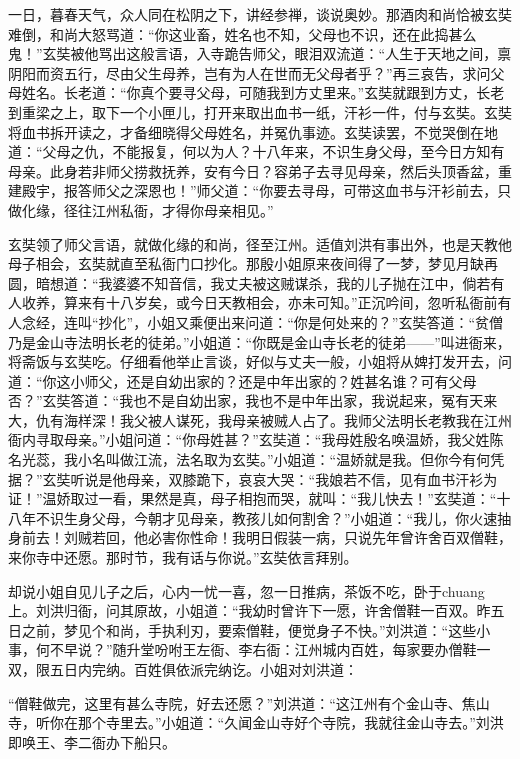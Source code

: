 \documentclass[12pt,UTF8]{ctexbook}
\begin{document}
{	一日，暮春天气，众人同在松阴之下，讲经参禅，谈说奥妙。那酒肉和尚恰被玄奘难倒，和尚大怒骂道：“你这业畜，姓名也不知，父母也不识，还在此捣甚么鬼！”玄奘被他骂出这般言语，入寺跪告师父，眼泪双流道：“人生于天地之间，禀阴阳而资五行，尽由父生母养，岂有为人在世而无父母者乎？”再三哀告，求问父母姓名。长老道：“你真个要寻父母，可随我到方丈里来。”玄奘就跟到方丈，长老到重梁之上，取下一个小匣儿，打开来取出血书一纸，汗衫一件，付与玄奘。玄奘将血书拆开读之，才备细晓得父母姓名，并冤仇事迹。玄奘读罢，不觉哭倒在地道：“父母之仇，不能报复，何以为人？十八年来，不识生身父母，至今日方知有母亲。此身若非师父捞救抚养，安有今日？容弟子去寻见母亲，然后头顶香盆，重建殿宇，报答师父之深恩也！”师父道：“你要去寻母，可带这血书与汗衫前去，只做化缘，径往江州私衙，才得你母亲相见。”
	
	玄奘领了师父言语，就做化缘的和尚，径至江州。适值刘洪有事出外，也是天教他母子相会，玄奘就直至私衙门口抄化。那殷小姐原来夜间得了一梦，梦见月缺再圆，暗想道：“我婆婆不知音信，我丈夫被这贼谋杀，我的儿子抛在江中，倘若有人收养，算来有十八岁矣，或今日天教相会，亦未可知。”正沉吟间，忽听私衙前有人念经，连叫“抄化”，小姐又乘便出来问道：“你是何处来的？”玄奘答道：“贫僧乃是金山寺法明长老的徒弟。”小姐道：“你既是金山寺长老的徒弟——”叫进衙来，将斋饭与玄奘吃。仔细看他举止言谈，好似与丈夫一般，小姐将从婢打发开去，问道：“你这小师父，还是自幼出家的？还是中年出家的？姓甚名谁？可有父母否？”玄奘答道：“我也不是自幼出家，我也不是中年出家，我说起来，冤有天来大，仇有海样深！我父被人谋死，我母亲被贼人占了。我师父法明长老教我在江州衙内寻取母亲。”小姐问道：“你母姓甚？”玄奘道：“我母姓殷名唤温娇，我父姓陈名光蕊，我小名叫做江流，法名取为玄奘。”小姐道：“温娇就是我。但你今有何凭据？”玄奘听说是他母亲，双膝跪下，哀哀大哭：“我娘若不信，见有血书汗衫为证！”温娇取过一看，果然是真，母子相抱而哭，就叫：“我儿快去！”玄奘道：“十八年不识生身父母，今朝才见母亲，教孩儿如何割舍？”小姐道：“我儿，你火速抽身前去！刘贼若回，他必害你性命！我明日假装一病，只说先年曾许舍百双僧鞋，来你寺中还愿。那时节，我有话与你说。”玄奘依言拜别。
	
	却说小姐自见儿子之后，心内一忧一喜，忽一日推病，茶饭不吃，卧于chuang上。刘洪归衙，问其原故，小姐道：“我幼时曾许下一愿，许舍僧鞋一百双。昨五日之前，梦见个和尚，手执利刃，要索僧鞋，便觉身子不快。”刘洪道：“这些小事，何不早说？”随升堂吩咐王左衙、李右衙：江州城内百姓，每家要办僧鞋一双，限五日内完纳。百姓俱依派完纳讫。小姐对刘洪道：
	
	“僧鞋做完，这里有甚么寺院，好去还愿？”刘洪道：“这江州有个金山寺、焦山寺，听你在那个寺里去。”小姐道：“久闻金山寺好个寺院，我就往金山寺去。”刘洪即唤王、李二衙办下船只。
	
}
\end{document}
